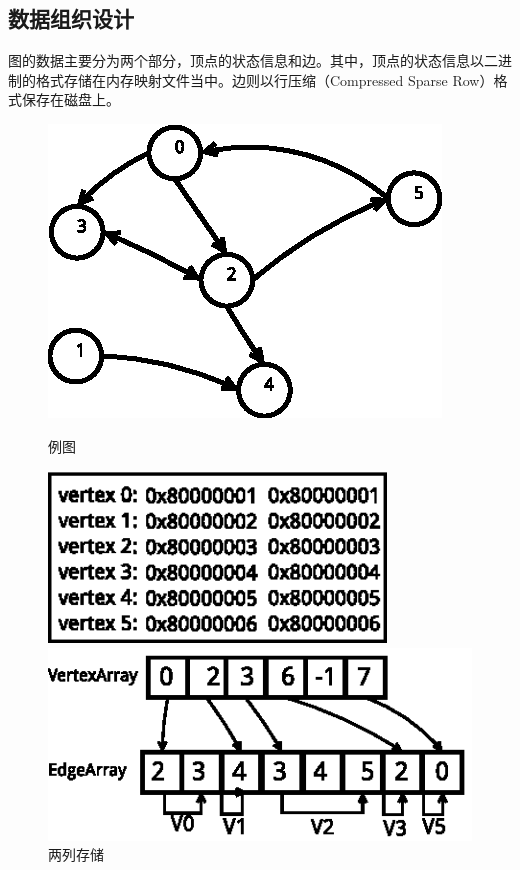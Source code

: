 \subsection{数据组织设计}
图的数据主要分为两个部分，顶点的状态信息和边。其中，顶点的状态信息以二进制的格式存储在内存映射文件当中。边则以行压缩（Compressed Sparse Row）格式保存在磁盘上。

\begin{figure}[htbp]
\centering
\begin{minipage}{0.4\textwidth}
\centering
\includegraphics[width=\textwidth]{myfigures/graph.eps}
\caption{例图}\label{fig:graph}
\end{minipage}
\begin{minipage}{0.4\textwidth}
\centering
\includegraphics[width=0.8\textwidth]{myfigures/twocol.eps}
\caption{两列存储}\label{fig:twocol}
\end{minipage}
\begin{minipage}{0.4\textwidth}
\centering
\includegraphics[width=\textwidth]{myfigures/csr.eps}

\end{minipage}
\end{figure}
